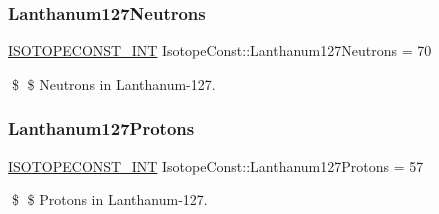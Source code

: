 \subsubsection{\texorpdfstring{Lanthanum127\+Neutrons}{Lanthanum127Neutrons}}
{\footnotesize\ttfamily \mbox{\hyperlink{group___isotope_const-_macros_ga5f18360b3e99483a35c32d789e62621c}{I\+S\+O\+T\+O\+P\+E\+C\+O\+N\+S\+T\+\_\+\+I\+NT}} Isotope\+Const\+::\+Lanthanum127\+Neutrons = 70}

\$ \$ Neutrons in Lanthanum-\/127. \mbox{\label{group___isotope_const-_lanthanum-_la127_ga465c687f4695a0cca436ae3557781f71}} 
\subsubsection{\texorpdfstring{Lanthanum127\+Protons}{Lanthanum127Protons}}
{\footnotesize\ttfamily \mbox{\hyperlink{group___isotope_const-_macros_ga5f18360b3e99483a35c32d789e62621c}{I\+S\+O\+T\+O\+P\+E\+C\+O\+N\+S\+T\+\_\+\+I\+NT}} Isotope\+Const\+::\+Lanthanum127\+Protons = 57}

\$ \$ Protons in Lanthanum-\/127. 